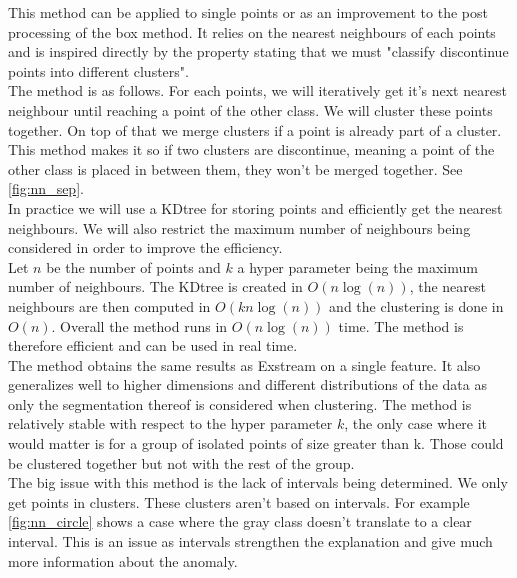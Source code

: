\documentclass[oneside, a4paper, onecolumn, 11pt]{article}
\begin{document}
This method can be applied to single points or as an improvement to the post processing of the box method. It relies on the nearest neighbours of each points and is inspired directly by the property stating that we must "classify discontinue points into different clusters".\\
The method is as follows. For each points, we will iteratively get it's next nearest neighbour until reaching a point of the other class. We will cluster these points together. On top of that we merge clusters if a point is already part of a cluster. This method makes it so if two clusters are discontinue, meaning a point of the other class is placed in between them, they won't be merged together. See \autoref{fig:nn_sep}.\\ 
In practice we will use a KDtree for storing points and efficiently get the nearest neighbours. We will also restrict the maximum number of neighbours being considered in order to improve the efficiency.\\
Let $n$ be the number of points and $k$  a hyper parameter being the maximum number of neighbours. The KDtree is created in $O(n \log(n))$, the nearest neighbours are then computed in $O(k n\log(n))$ and the clustering is done in $O(n)$. Overall the method runs in $O(n \log(n))$ time. The method is therefore efficient and can be used in real time.\\
The method obtains the same results as Exstream on a single feature. It also generalizes well to higher dimensions and different distributions of the data as only the segmentation thereof is considered when clustering. The method is relatively stable with respect to the hyper parameter $k$, the only case where it would matter is for a group of isolated points of size greater than k. Those could be clustered together but not with the rest of the group.\\
The big issue with this method is the lack of intervals being determined. We only get points in clusters. These clusters aren't based on intervals. For example \autoref{fig:nn_circle} shows a case where the gray class doesn't translate to a clear interval. This is an issue as intervals strengthen the explanation and give much more information about the anomaly.
\end{document}
